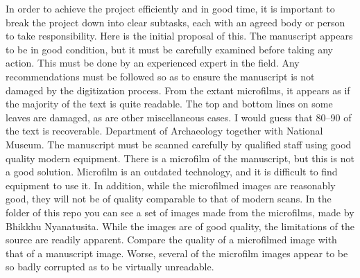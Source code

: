 {}In order to achieve the project efficiently and in good time, it is important to break the project down into clear subtasks, each with an agreed body or person to take responsibility. Here is the initial proposal of this.\markdownRendererInterblockSeparator
{}\markdownRendererInterblockSeparator
{}The manuscript appears to be in good condition, but it must be carefully examined before taking any action. This must be done by an experienced expert in the field. Any recommendations must be followed so as to ensure the manuscript is not damaged by the digitization process.\markdownRendererInterblockSeparator
{}From the extant microfilms, it appears as if the majority of the text is quite readable. The top and bottom lines on some leaves are damaged, as are other miscellaneous cases. I would guess that 80\markdownRendererPercentSign{}–90\markdownRendererPercentSign{} of the text is recoverable.\markdownRendererInterblockSeparator
{}\markdownRendererBlockQuoteBegin
{} Department of Archaeology together with National Museum.
\markdownRendererBlockQuoteEnd \markdownRendererInterblockSeparator
{}\markdownRendererInterblockSeparator
{}The manuscript must be scanned carefully by qualified staff using good quality modern equipment.\markdownRendererInterblockSeparator
{}There is a microfilm of the manuscript, but this is not a good solution. Microfilm is an outdated technology, and it is difficult to find equipment to use it. In addition, while the microfilmed images are reasonably good, they will not be of quality comparable to that of modern scans. In the  folder of this repo you can see a set of images made from the microfilms, made by Bhikkhu Nyanatusita. While the images are of good quality, the limitations of the source are readily apparent. Compare the quality of a microfilmed image with that of a manuscript image.\markdownRendererInterblockSeparator
{}\markdownRendererInterblockSeparator
{}\markdownRendererInterblockSeparator
{}Worse, several of the microfilm images appear to be so badly corrupted as to be virtually unreadable.\markdownRendererInterblockSeparator
{}\markdownRendererInterblockSeparator
